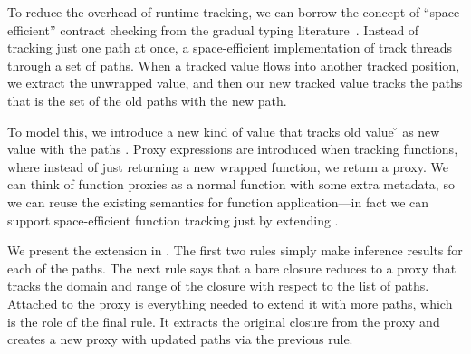 
To reduce the overhead of runtime tracking, we can borrow
the concept of ``space-efficient'' contract checking from
the gradual typing literature~\cite{Herman:2010}.
%
Instead of tracking just one path at once, a space-efficient
implementation of track threads through a set of paths.
When a tracked value flows into another tracked position,
we extract the unwrapped value, and then our new tracked value
tracks the paths that is the set of the old paths with the new path.

To model this, we introduce a new kind of value \ProxyV{\v{}}{\closure{\e{}}{\openv{}}}{\ova{\inferpath{}}}
that tracks old value \v{} as new value \closure{\e{}}{\openv{}} with the paths \ova{\inferpath{}}.
Proxy expressions are introduced when tracking functions, where instead of just returning
a new wrapped function, we return a proxy.
We can think of function proxies as a normal function with some extra metadata, so we
can reuse the existing semantics for function application---in fact we
can support space-efficient function tracking just by extending \trackEOp{}.

We present the extension in .
The first two \trackEOp{} rules simply make inference
results for each of the paths.
The next rule says that a bare closure
reduces to a proxy that tracks the domain and range
of the closure with respect to the list of paths.
Attached to the proxy is everything needed to extend
it with more paths, which is the role of the
final rule. It extracts the original closure from the
proxy and creates a new proxy with updated paths
via the previous rule.

